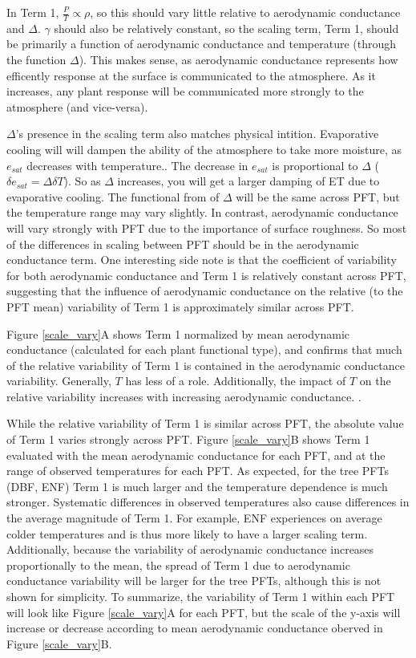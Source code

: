 \documentclass[draft,linenumbers]{agujournal}
\begin{document}
In Term 1, $\frac{P}{T} \propto \rho$, so this should vary little relative to aerodynamic conductance and $\Delta$.  $\gamma$ should also be relatively constant, so the scaling term, Term 1, should be primarily a function of aerodynamic conductance and temperature (through the function $\Delta$). This makes sense, as aerodynamic conductance represents how efficently response at the surface is communicated to the atmosphere. As it increases, any plant response will be communicated more strongly to the atmosphere (and vice-versa).

$\Delta$'s presence in the scaling term also matches physical intition. Evaporative cooling will will dampen the ability of the atmosphere to take more moisture, as $e_{sat}$ decreases with temperature.. The decrease in $e_{sat}$ is proportional to $\Delta$ ($\delta e_{sat} = \Delta \delta T$). So as $\Delta$ increases, you will get a larger damping of ET due to evaporative cooling.  The functional from of $\Delta$ will be the same across PFT, but the temperature range may vary slightly. In contrast, aerodynamic conductance will vary strongly with PFT due to the importance of surface roughness. So most of the differences in scaling between PFT should be in the aerodynamic conductance term. One interesting side note is that the coefficient of variability for both aerodynamic conductance and Term 1 is relatively constant across PFT, suggesting that the influence of aerodynamic conductance on the relative (to the PFT mean) variability of Term 1 is approximately similar across PFT.

Figure \ref{scale_vary}A shows Term 1 normalized by mean aerodynamic conductance (calculated for each plant functional type), and confirms that much of the relative variability of Term 1 is contained in the aerodynamic conductance variability. Generally, $T$ has less of a role. Additionally, the impact of $T$ on the relative variability increases with increasing aerodynamic conductance. .


While the relative variability of Term 1 is similar across PFT, the absolute value of Term 1 varies strongly across PFT. Figure \ref{scale_vary}B shows Term 1 evaluated with the mean aerodynamic conductance for each PFT, and at the range of observed temperatures for each PFT. As expected, for the tree PFTs (DBF, ENF) Term 1 is much larger and the temperature dependence is much stronger. Systematic differences in observed temperatures also cause differences in the average magnitude of Term 1. For example, ENF experiences on average colder temperatures and is thus more likely to have a larger scaling term. Additionally, because the variability of aerodynamic conductance increases proportionally to the mean, the spread of Term 1 due to aerodynamic conductance variability will be larger for the tree PFTs, although this is not shown for simplicity. To summarize, the variability of Term 1 within each PFT will look like Figure \ref{scale_vary}A for each PFT, but the scale of the y-axis will increase or decrease according to mean aerodynamic conductance oberved in Figure \ref{scale_vary}B.
 
\end{document}
